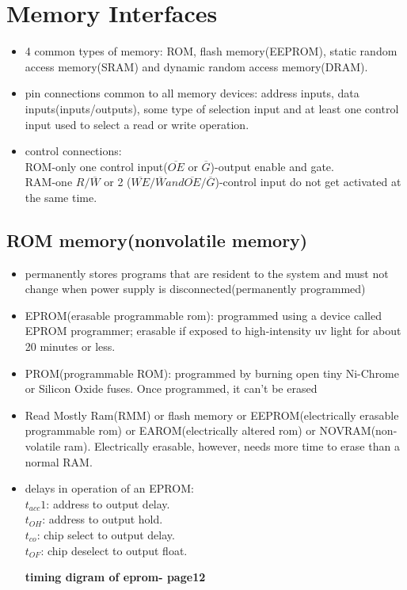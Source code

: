 \documentclass[12pt]{article}
\begin{document}
\newpage

\section{Memory Interfaces}
\begin{itemize}
	\item 4 common types of memory: ROM, flash memory(EEPROM), static random access memory(SRAM) and dynamic random access memory(DRAM).
	
	\item pin connections common to all memory devices: address inputs, data inputs(inputs/outputs), some type of selection input and at least one control input used to select a read or write operation.
	
	\item control connections:\\
	ROM-only one control input($\overline{OE}$ or $\overline{G}$)-output enable and gate.\\
	RAM-one $R/\overline{W}$ or 2 ($\overline{WE}/\overline{W} and \overline{OE}/\overline{G}$)-control input do not get activated at the same time.
\end{itemize}

\subsection{ROM memory(nonvolatile memory)}
\begin{itemize}
	\item permanently stores programs that are resident to the system and must not change when power supply is disconnected(permanently programmed)
	
	\item EPROM(erasable programmable rom): programmed using a device called EPROM programmer; erasable if exposed to high-intensity uv light for about 20 minutes or less.
	
	\item PROM(programmable ROM): programmed by burning open tiny Ni-Chrome or Silicon Oxide fuses. Once programmed, it can't be erased
	
	\item Read Mostly Ram(RMM) or flash memory or EEPROM(electrically erasable programmable rom) or EAROM(electrically altered rom) or NOVRAM(non-volatile ram). Electrically erasable, however, needs more time to erase than a normal RAM.
	
	\item delays in operation of an EPROM:\\
	$t_{acc}1$: address to output delay.\\
	$t_{OH}$: address to output hold.\\
	$t_{co}$: chip select to output delay.\\
	$t_{OF}$: chip deselect to output float.
	
	\textbf{timing digram of eprom- page12} 
\end{itemize}
\end{document}
